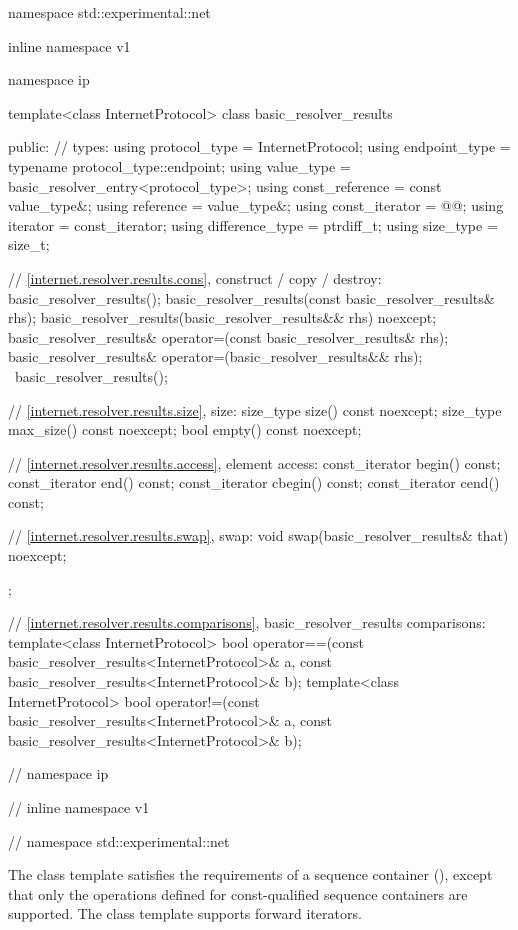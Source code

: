 \begin{codeblock}
namespace std::experimental::net {
inline namespace v1 {
namespace ip {

  template<class InternetProtocol>
  class basic_resolver_results
  {
  public:
    // types:
    using protocol_type = InternetProtocol;
    using endpoint_type = typename protocol_type::endpoint;
    using value_type = basic_resolver_entry<protocol_type>;
    using const_reference = const value_type&;
    using reference = value_type&;
    using const_iterator = @@;
    using iterator = const_iterator;
    using difference_type = ptrdiff_t;
    using size_type = size_t;

    // \ref{internet.resolver.results.cons}, construct / copy / destroy:
    basic_resolver_results();
    basic_resolver_results(const basic_resolver_results& rhs);
    basic_resolver_results(basic_resolver_results&& rhs) noexcept;
    basic_resolver_results& operator=(const basic_resolver_results& rhs);
    basic_resolver_results& operator=(basic_resolver_results&& rhs);
    ~basic_resolver_results();

    // \ref{internet.resolver.results.size}, size:
    size_type size() const noexcept;
    size_type max_size() const noexcept;
    bool empty() const noexcept;

    // \ref{internet.resolver.results.access}, element access:
    const_iterator begin() const;
    const_iterator end() const;
    const_iterator cbegin() const;
    const_iterator cend() const;

    // \ref{internet.resolver.results.swap}, swap:
    void swap(basic_resolver_results& that) noexcept;
  };

  // \ref{internet.resolver.results.comparisons}, basic_resolver_results comparisons:
  template<class InternetProtocol>
    bool operator==(const basic_resolver_results<InternetProtocol>& a,
                    const basic_resolver_results<InternetProtocol>& b);
  template<class InternetProtocol>
    bool operator!=(const basic_resolver_results<InternetProtocol>& a,
                    const basic_resolver_results<InternetProtocol>& b);

} // namespace ip
} // inline namespace v1
} // namespace std::experimental::net
\end{codeblock}

\pnum
The class template  satisfies the requirements of a sequence container (), except that only the operations defined for const-qualified sequence containers are supported. The class template  supports forward iterators.

